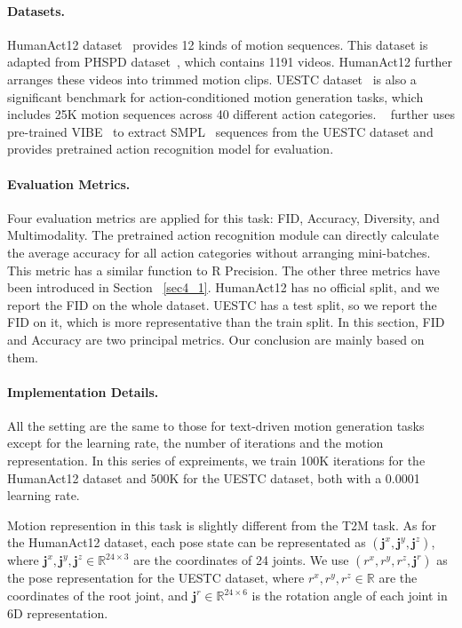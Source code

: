 \paragraph{Datasets.}\label{sec4_2_1} HumanAct12 dataset~\citep{guo2020action2motion} provides 12 kinds of motion sequences. This dataset is adapted from PHSPD dataset~\citep{zou20203d}, which contains 1191 videos. HumanAct12 further arranges these videos into trimmed motion clips. UESTC dataset~\citep{ji2018large} is also a significant benchmark for action-conditioned motion generation tasks, which includes 25K motion sequences across 40 different action categories. ~\cite{petrovich2021action} further uses pre-trained VIBE~\citep{kocabas2020vibe} to extract SMPL~\citep{loper2015smpl} sequences from the UESTC dataset and provides pretrained action recognition model for evaluation.

\paragraph{Evaluation Metrics.}\label{sec4_2_2} Four evaluation metrics are applied for this task: FID, Accuracy, Diversity, and Multimodality. The pretrained action recognition module can directly calculate the average accuracy for all action categories without arranging mini-batches. This metric has a similar function to R Precision. The other three metrics have been introduced in Section ~\ref{sec4_1}. HumanAct12 has no official split, and we report the FID on the whole dataset. UESTC has a test split, so we report the FID on it, which is more representative than the train split. In this section, FID and Accuracy are two principal metrics. Our conclusion are mainly based on them.

\paragraph{Implementation Details.}\label{sec4_2_3}
All the setting are the same to those for text-driven motion generation tasks except for the learning rate, the number of iterations and the motion representation. In this series of expreiments, we train 100K iterations for the HumanAct12 dataset and 500K for the UESTC dataset, both with a 0.0001 learning rate.

Motion represention in this task is slightly different from the T2M task. As for the HumanAct12 dataset, each pose state can be representated as $(\mathbf{j}^x, \mathbf{j}^y, \mathbf{j}^z)$, where $\mathbf{j}^x, \mathbf{j}^y, \mathbf{j}^z \in \mathbb{R}^{24 \times 3}$ are the coordinates of 24 joints. We use $(r^x, r^y, r^z, \mathbf{j}^r)$ as the pose representation for the UESTC dataset, where $r^x, r^y, r^z \in \mathbb{R}$ are the coordinates of the root joint, and $\mathbf{j}^r \in \mathbb{R}^{24 \times 6}$ is the rotation angle of each joint in 6D representation.



